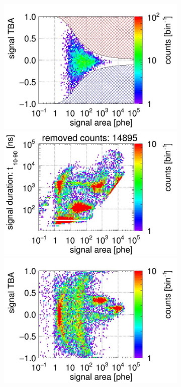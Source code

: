 \begin{landscape}
\begin{figure}[!p]
\begin{subfigure}[t]{0.32\textwidth}
			\includegraphics[width=\figurewidth,clip,trim={0 98 0 40}]{Figures/GasTest/CutsValid/res64769/tbapa29Vecfig64769.jpg}
			\includegraphics[width=\figurewidth,clip,trim={0 98 0 15}]{Figures/GasTest/CutsValid/res64769/pdpaX29Vecfig64769.jpg}
			\includegraphics[width=\figurewidth,clip,trim={0 8 0 40}]{Figures/GasTest/CutsValid/res64769/tbapaX29Vecfig64769.jpg}

\end{subfigure}
\end{figure}
\end{landscape}
